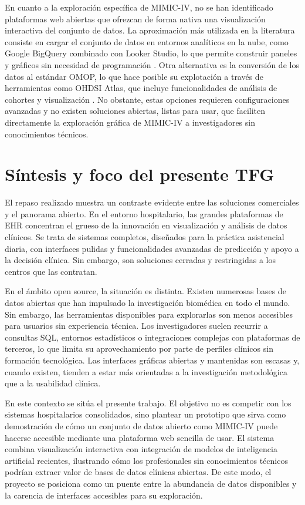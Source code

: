 En cuanto a la exploración específica de MIMIC-IV, no se han identificado plataformas web abiertas que ofrezcan de forma nativa una visualización interactiva del conjunto de datos. La aproximación más utilizada en la literatura consiste en cargar el conjunto de datos en entornos analíticos en la nube, como Google BigQuery combinado con Looker Studio, lo que permite construir paneles y gráficos sin necesidad de programación \cite{bigquery_mimic}. Otra alternativa es la conversión de los datos al estándar OMOP, lo que hace posible su explotación a través de herramientas como OHDSI Atlas, que incluye funcionalidades de análisis de cohortes y visualización \cite{OHDSI_Atlas, MIMICIV_OMOP_Demo}. No obstante, estas opciones requieren configuraciones avanzadas y no existen soluciones abiertas, listas para usar, que faciliten directamente la exploración gráfica de MIMIC-IV a investigadores sin conocimientos técnicos.



\section{Síntesis y foco del presente TFG}

El repaso realizado muestra un contraste evidente entre las soluciones comerciales y el panorama abierto. En el entorno hospitalario, las grandes plataformas de EHR concentran el grueso de la innovación en visualización y análisis de datos clínicos. Se trata de sistemas completos, diseñados para la práctica asistencial diaria, con interfaces pulidas y funcionalidades avanzadas de predicción y apoyo a la decisión clínica. Sin embargo, son soluciones cerradas y restringidas a los centros que las contratan.

En el ámbito open source, la situación es distinta. Existen numerosas bases de datos abiertas que han impulsado la investigación biomédica en todo el mundo. Sin embargo, las herramientas disponibles para explorarlas son menos accesibles para usuarios sin experiencia técnica. Los investigadores suelen recurrir a consultas SQL, entornos estadísticos o integraciones complejas con plataformas de terceros, lo que limita su aprovechamiento por parte de perfiles clínicos sin formación tecnológica. Las interfaces gráficas abiertas y mantenidas son escasas y, cuando existen, tienden a estar más orientadas a la investigación metodológica que a la usabilidad clínica.

En este contexto se sitúa el presente trabajo. El objetivo no es competir con los sistemas hospitalarios consolidados, sino plantear un prototipo que sirva como demostración de cómo un conjunto de datos abierto como MIMIC-IV puede hacerse accesible mediante una plataforma web sencilla de usar. El sistema combina visualización interactiva con integración de modelos de inteligencia artificial recientes, ilustrando cómo los profesionales sin conocimientos técnicos podrían extraer valor de bases de datos clínicas abiertas. De este modo, el proyecto se posiciona como un puente entre la abundancia de datos disponibles y la carencia de interfaces accesibles para su exploración.

